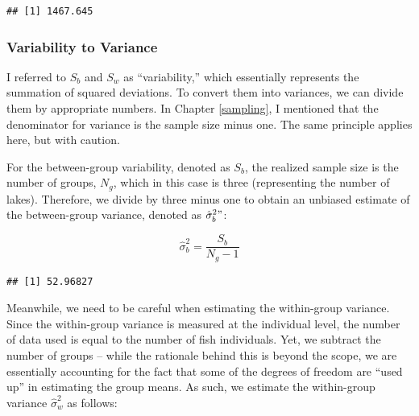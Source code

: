 \documentclass[
]{article}
\newenvironment{Shaded}{\begin{snugshade}}{\end{snugshade}}
\newcommand{\CommentTok}[1]{\textcolor[rgb]{0.56,0.35,0.01}{\textit{#1}}}
\newcommand{\DecValTok}[1]{\textcolor[rgb]{0.00,0.00,0.81}{#1}}
\newcommand{\FunctionTok}[1]{\textcolor[rgb]{0.00,0.00,0.00}{#1}}
\newcommand{\NormalTok}[1]{#1}
\newcommand{\OtherTok}[1]{\textcolor[rgb]{0.56,0.35,0.01}{#1}}
\newcommand{\SpecialCharTok}[1]{\textcolor[rgb]{0.00,0.00,0.00}{#1}}
\begin{document}
\begin{verbatim}
## [1] 1467.645
\end{verbatim}

\hypertarget{variability-to-variance}{%
\subsubsection{Variability to Variance}\label{variability-to-variance}}

I referred to \(S_b\) and \(S_w\) as ``variability,'' which essentially represents the summation of squared deviations. To convert them into variances, we can divide them by appropriate numbers. In Chapter \ref{sampling}, I mentioned that the denominator for variance is the sample size minus one. The same principle applies here, but with caution.

For the between-group variability, denoted as \(S_b\), the realized sample size is the number of groups, \(N_g\), which in this case is three (representing the number of lakes). Therefore, we divide by three minus one to obtain an unbiased estimate of the between-group variance, denoted as \(\hat{\sigma}_b^2"\):

\[
\hat{\sigma}^2_b = \frac{S_b}{N_g-1}
\]

\begin{Shaded}
\end{Shaded}

\begin{verbatim}
## [1] 52.96827
\end{verbatim}

Meanwhile, we need to be careful when estimating the within-group variance. Since the within-group variance is measured at the individual level, the number of data used is equal to the number of fish individuals. Yet, we subtract the number of groups -- while the rationale behind this is beyond the scope, we are essentially accounting for the fact that some of the degrees of freedom are ``used up'' in estimating the group means. As such, we estimate the within-group variance \(\hat{\sigma}^2_w\) as follows:
\end{document}
